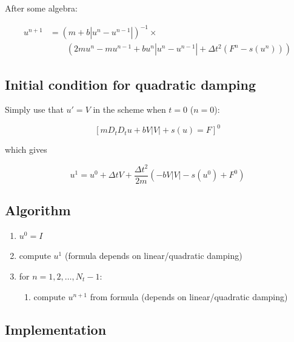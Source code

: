 \documentclass[%
oneside,                 %
final,                   %
10pt]{article}
\begin{document}
After some algebra:

\begin{align*}
u^{n+1} &=  \left( m + b|u^n-u^{n-1}|\right)^{-1}\times \\ 
& \qquad \left(2m u^n - mu^{n-1} + bu^n|u^n-u^{n-1}| + \Delta t^2 (F^n - s(u^n))
\right)
\end{align*}

\subsection*{Initial condition for quadratic damping}

Simply use that $u'=V$ in the scheme when $t=0$ ($n=0$):

\[
[mD_tD_t u + bV|V| + s(u) = F]^0
\]

which gives

\[
u^1 = u^0 + \Delta t V + \frac{\Delta t^2}{2m}\left(-bV|V| - s(u^0) + F^0\right)
\]

\subsection*{Algorithm}

\begin{enumerate}
 \item $u^0=I$

 \item compute $u^1$ (formula depends on linear/quadratic damping)

 \item for $n=1,2,\ldots,N_t-1$:
\begin{enumerate}

   \item compute $u^{n+1}$ from formula (depends on linear/quadratic damping)
\end{enumerate}

\noindent
\end{enumerate}

\noindent
\subsection*{Implementation}
\end{document}
